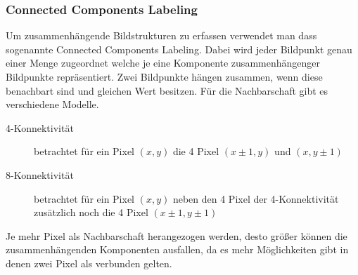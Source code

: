 \subsubsection*{Connected Components Labeling}

Um zusammenhängende Bildstrukturen zu erfassen verwendet man dass sogenannte
Connected Components Labeling. Dabei wird jeder Bildpunkt genau einer Menge
zugeordnet welche je eine Komponente zusammenhängenger Bildpunkte repräsentiert.
Zwei Bildpunkte hängen zusammen, wenn diese benachbart sind und gleichen Wert
besitzen. Für die Nachbarschaft gibt es verschiedene Modelle.

\begin{description}
  \item[4-Konnektivität]
    betrachtet für ein Pixel $(x,y)$ die 4 Pixel $(x\pm1,y)$ und $(x,y\pm1)$
  \item[8-Konnektivität]
    betrachtet für ein Pixel $(x,y)$ neben den 4 Pixel der 4-Konnektivität
    zusätzlich noch die 4 Pixel $(x\pm1,y\pm1)$
\end{description}

Je mehr Pixel als Nachbarschaft herangezogen werden, desto größer können die
zusammenhängenden Komponenten ausfallen, da es mehr Möglichkeiten gibt in denen
zwei Pixel als verbunden gelten.
